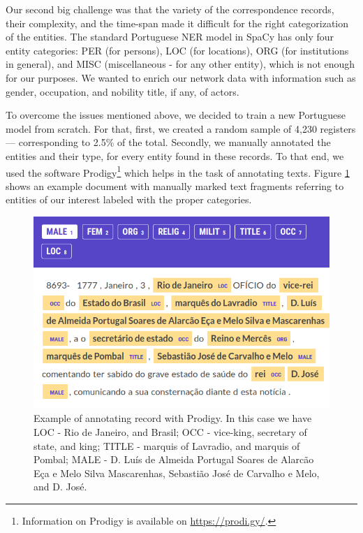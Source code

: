 \documentclass{article}
\begin{document}
Our second big challenge was that the variety of the correspondence records, their complexity, and the time-span made it difficult for the right categorization of the entities. The standard Portuguese NER model in SpaCy has only four entity categories: PER (for persons), LOC (for locations), ORG (for institutions in general), and MISC (miscellaneous - for any other entity), which is not enough for our purposes. We wanted to enrich our network data with information such as gender, occupation, and nobility title, if any, of actors.

To overcome the issues mentioned above, we decided to train a new Portuguese model from scratch. For that, first, we created a random sample of 4,230 registers --- corresponding to 2.5\% of the total. Secondly, we manually annotated the entities and their type, for every entity found in these records. To that end, we used the software Prodigy\footnote{Information on Prodigy is available on \url{https://prodi.gy/}.} which helps in the task of annotating texts. Figure \ref{fig:prodigy} shows an example document with manually marked text fragments referring to entities of our interest labeled with the proper categories. 

\begin{figure}
	\centering
	\includegraphics[scale=0.40]{prodigy.png}
	\caption{Example of annotating record with Prodigy. In this case we have LOC - Rio de Janeiro, and Brasil; OCC - vice-king, secretary of state, and king; TITLE - marquis of Lavradio, and marquis of Pombal; MALE - D. Luís de Almeida Portugal Soares de Alarcão Eça e Melo Silva Mascarenhas, Sebastião José de Carvalho e Melo, and D. José.}
	\label{fig:prodigy}
\end{figure}
\end{document}
